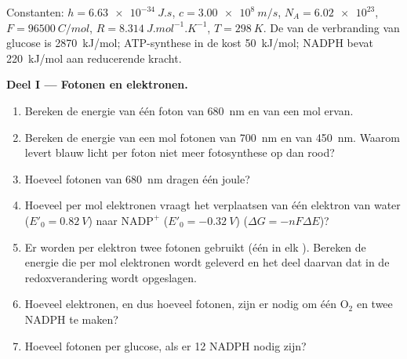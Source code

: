 \begin{problem}
\label{pb:b1:photosynthesis:1}
Constanten: $h = \qty{6.63e-34}{J.s}$, $c = \qty{3.00e8}{m/s}$,
$N_A = \num{6.02e23}$, $F = \qty{96500}{C/mol}$, $R = \qty{8.314}{J.mol^{-1}.K^{-1}}$,
$T = \qty{298}{K}$. De  van de verbranding van glucose is
\qty{2870}{kJ/mol}; ATP-synthese in de  kost \qty{50}{kJ/mol}; NADPH
bevat \qty{220}{kJ/mol} aan reducerende kracht.

\medskip
\noindent\textbf{Deel I --- Fotonen en elektronen.}
\begin{enumerate}
  \item Bereken de energie van één foton van \qty{680}{nm} en van een mol
        ervan.
  \item Bereken de energie van een mol fotonen van \qty{700}{nm} en van
        \qty{450}{nm}. Waarom levert blauw licht per foton niet meer
        fotosynthese op dan rood?
  \item Hoeveel fotonen van \qty{680}{nm} dragen één joule?
  \item Hoeveel  per mol elektronen vraagt het verplaatsen van
        één elektron van water ($E'_0 = \qty{+0.82}{V}$) naar
        $\mathrm{NADP^+}$ ($E'_0 = \qty{-0.32}{V}$) ($\Delta G = -nF\Delta E$)?
  \item Er worden per elektron twee fotonen gebruikt (één in elk
        ). Bereken de energie die per mol elektronen wordt
        geleverd en het deel daarvan dat in de redoxverandering wordt
        opgeslagen.
  \item Hoeveel elektronen, en dus hoeveel fotonen, zijn er nodig om één
        $\mathrm{O_2}$ en twee NADPH te maken?
  \item Hoeveel fotonen per glucose, als er 12 NADPH nodig zijn?
\end{enumerate}


\end{problem}
